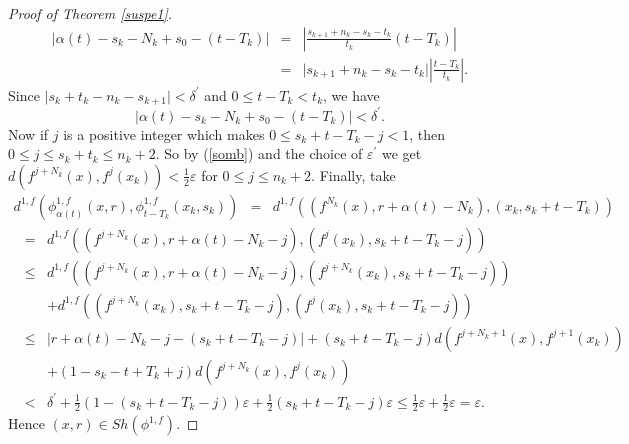 \documentclass{amsart}
\theoremstyle{definition}
\newcommand{\ep}{\varepsilon}
\begin{document}
\begin{proof}[Proof of Theorem \ref{suspe1}]
	\begin{eqnarray*}
		\vert \alpha(t)-s_k-N_k+s_0-(t-T_k)\vert &=&\left\vert \frac{s_{k+1}+n_k-s_k-t_k}{t_k}(t-T_k)\right\vert\\
		&=& \vert s_{k+1}+n_k-s_k-t_k\vert\left\vert\frac{t-T_k}{t_k}\right\vert.
	\end{eqnarray*}
	Since $\vert s_k+t_k-n_k-s_{k+1}\vert<\delta^{\prime}$ and $0\leq t-T_k<t_k$, we have 
	\begin{equation}
	\vert \alpha(t)-s_k-N_k+s_0-(t-T_k)\vert<\delta^{\prime}.
	\end{equation}
	Now if $j$ is a positive integer which makes $0\leq s_k+t-T_k-j<1$, then 
	$0\leq j\leq s_k+t_k\leq n_k+2$. So by (\ref{somb}) and the choice of $\ep^{\prime}$ we get $d(f^{j+N_k}(x),f^{j}(x_k))<\tfrac{1}{2}\ep$ for $0\leq j\leq n_k+2$. Finally, take
	\begin{eqnarray*}
		d^{1,f}(\phi^{1,f}_{\alpha(t)}(x,r),\phi^{1,f}_{t-T_k}(x_k,s_k))&=&d^{1,f}\left((f^{N_k}(x),r+\alpha(t)-N_k),(x_k,s_k+t-T_k)\right)
	\end{eqnarray*}
	\begin{eqnarray*}
		&=&d^{1,f}\left((f^{j+N_k}(x),r+\alpha(t)-N_k-j),(f^j(x_k),s_k+t-T_k-j)\right)\\
		&\leq & d^{1,f}\left((f^{j+N_k}(x),r+\alpha(t)-N_k-j),(f^{j+N_k}(x_k),s_k+t-T_k-j)\right)\\
		& &+d^{1,f}\left((f^{j+N_k}(x_k),s_k+t-T_k-j),(f^{j}(x_k),s_k+t-T_k-j)\right)\\
		&\leq & \vert r+\alpha(t)-N_k-j-(s_k+t-T_k-j)\vert+(s_k+t-T_k-j)d(f^{j+N_k+1}(x),f^{j+1}(x_k))\\
		& & +(1-s_k-t+T_k+j)d(f^{j+N_k}(x),f^j(x_k))\\
		&< & \delta^{\prime}+\tfrac{1}{2}(1-(s_k+t-T_k-j))\ep+\tfrac{1}{2}(s_k+t-T_k-j)\ep\leq \tfrac{1}{2}\ep+\tfrac{1}{2}\ep=\ep.
	\end{eqnarray*}
	Hence $(x,r)\in Sh(\phi^{1,f})$.
\end{proof}
\end{document}
